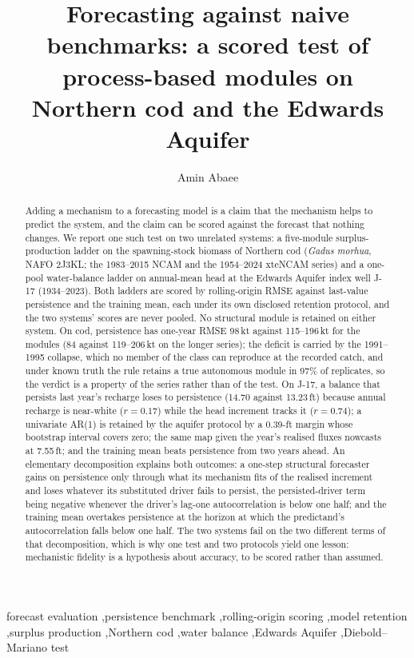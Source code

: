 \documentclass[preprint,11pt,authoryear]{elsarticle}
\theoremstyle{definition}
\theoremstyle{remark}
\begin{document}
\begin{frontmatter}

\title{Forecasting against naive benchmarks: a scored test of process-based modules on Northern cod and the Edwards Aquifer}

\author[1]{Amin Abaee}

\begin{abstract}
Adding a mechanism to a forecasting model is a claim that the mechanism helps to predict the system, and the claim can be scored against the forecast that nothing changes. We report one such test on two unrelated systems: a five-module surplus-production ladder on the spawning-stock biomass of Northern cod (\emph{Gadus morhua}, NAFO 2J3KL; the 1983--2015 NCAM and the 1954--2024 xteNCAM series) and a one-pool water-balance ladder on annual-mean head at the Edwards Aquifer index well J-17 (1934--2023). Both ladders are scored by rolling-origin RMSE against last-value persistence and the training mean, each under its own disclosed retention protocol, and the two systems' scores are never pooled. No structural module is retained on either system. On cod, persistence has one-year RMSE 98\,kt against 115--196\,kt for the modules (84 against 119--206\,kt on the longer series); the deficit is carried by the 1991--1995 collapse, which no member of the class can reproduce at the recorded catch, and under known truth the rule retains a true autonomous module in 97\% of replicates, so the verdict is a property of the series rather than of the test. On J-17, a balance that persists last year's recharge loses to persistence (14.70 against 13.23\,ft) because annual recharge is near-white ($r=0.17$) while the head increment tracks it ($r=0.74$); a univariate AR(1) is retained by the aquifer protocol by a 0.39-ft margin whose bootstrap interval covers zero; the same map given the year's realised fluxes nowcasts at 7.55\,ft; and the training mean beats persistence from two years ahead. An elementary decomposition explains both outcomes: a one-step structural forecaster gains on persistence only through what its mechanism fits of the realised increment and loses whatever its substituted driver fails to persist, the persisted-driver term being negative whenever the driver's lag-one autocorrelation is below one half; and the training mean overtakes persistence at the horizon at which the predictand's autocorrelation falls below one half. The two systems fail on the two different terms of that decomposition, which is why one test and two protocols yield one lesson: mechanistic fidelity is a hypothesis about accuracy, to be scored rather than assumed.
\end{abstract}

\begin{keyword}
forecast evaluation \sep persistence benchmark \sep rolling-origin scoring \sep model retention \sep surplus production \sep Northern cod \sep water balance \sep Edwards Aquifer \sep Diebold--Mariano test
\end{keyword}

\end{frontmatter}
\end{document}
